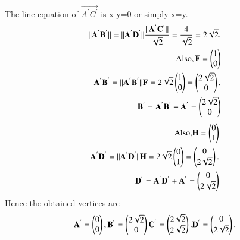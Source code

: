 \documentclass[journal,12pt,twocolumn]{IEEEtran}
\begin{document}
The line equation of $\vec{A^{'}C^{'}}$ is x-y=0 or simply x=y.\\
\begin{align}
\begin{split}
\Vert\mathbf{A^{'}B^{'}}\Vert =\Vert\mathbf{A^{'}D^{'}}\Vert \frac{\Vert\mathbf{A^{'}C^{'}}\Vert}{\sqrt{2}} = \frac{4}{\sqrt{2}}=2\sqrt{2}.\\
\text{Also}, \mathbf{F} = \begin{pmatrix}1\\0\end{pmatrix}\\
\mathbf{A^{'}B^{'}} = \Vert\mathbf{A^{'}B^{'}}\Vert \mathbf{F}=2\sqrt{2}\begin{pmatrix}1\\0\end{pmatrix}=\begin{pmatrix}2\sqrt{2}\\0\end{pmatrix}.\\
\mathbf{B^{'}} = \mathbf{A^{'}B^{'}}+\mathbf{A^{'}}=\begin{pmatrix}2\sqrt{2}\\0\end{pmatrix}\\
\end{split}
\end{align}
\begin{align}
\begin{split}
\text{Also,} \mathbf{H} = \begin{pmatrix}0\\1\end{pmatrix}\\
\mathbf{A^{'}D^{'}} = \Vert\mathbf{A^{'}D^{'}}\Vert \mathbf{H}=2\sqrt{2}\begin{pmatrix}0\\1\end{pmatrix}=\begin{pmatrix}0\\2\sqrt{2}\end{pmatrix}.\\
\mathbf{D^{'}} = \mathbf{A^{'}D^{'}}+\mathbf{A^{'}}=\begin{pmatrix}0\\2\sqrt{2}\end{pmatrix}\\
\end{split}
\end{align}
Hence the obtained vertices are 
\begin{align}
\begin{split}
\mathbf{A^{'}} = \begin{pmatrix}0 \\ 0\end{pmatrix},
\mathbf{B^{'}} = \begin{pmatrix}2\sqrt{2}\\0\end{pmatrix}
\mathbf{C^{'}} = \begin{pmatrix}2\sqrt{2}\\2\sqrt{2}\end{pmatrix}.
\mathbf{D^{'}} = \begin{pmatrix}0\\2\sqrt{2}\end{pmatrix}.
\end{split}
\end{align}
\end{document}
